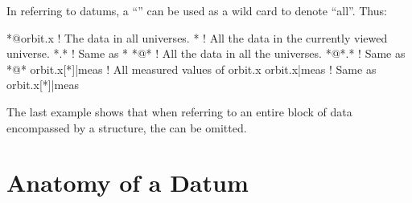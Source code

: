 In referring to datums, a ``\vn{*}'' can be used as a wild card to 
denote ``all''. Thus:
\begin{example}
  *@orbit.x       ! The  data in all universes.
  *               ! All the data in the currently viewed universe.
  *.*             ! Same as *
  *@*             ! All the data in all the universes. 
  *@*.*           ! Same as *@*
  orbit.x[*]|meas ! All measured values of orbit.x
  orbit.x|meas    ! Same as orbit.x[*]|meas
\end{example}
The last example shows that when referring to an entire block of data
encompassed by a  structure, the \vn{[*]} can be omitted.

\section{Anatomy of a Datum}
\label{s:data.anatomy}

